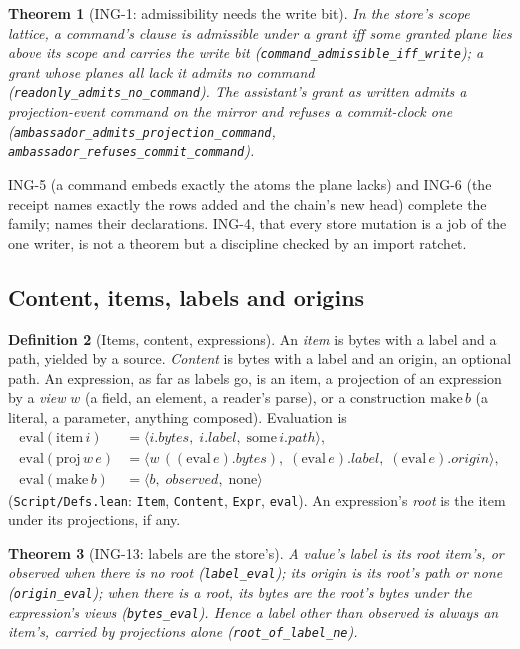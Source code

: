 \documentclass[11pt]{article}
\theoremstyle{plain}
\newtheorem{theorem}{Theorem}[section]
\theoremstyle{definition}
\newtheorem{definition}[theorem]{Definition}
\theoremstyle{remark}
\newcommand{\lean}[1]{\texttt{#1}}
\newcommand{\ing}[1]{ING-#1}
\begin{document}
\begin{theorem}[\ing{1}: admissibility needs the write bit]
In the store's scope lattice, a command's clause is admissible under a grant iff some granted
plane lies above its scope and carries the write bit (\lean{command\_admissible\_iff\_write});
a grant whose planes all lack it admits no command (\lean{readonly\_admits\_no\_command}). The
assistant's grant as written admits a projection-event command on the mirror and refuses a
commit-clock one (\lean{ambassador\_admits\_projection\_command},
\lean{ambassador\_refuses\_commit\_command}).
\end{theorem}

\ing{5} (a command embeds exactly the atoms the plane lacks) and \ing{6} (the receipt names
exactly the rows added and the chain's new head) complete the family;  names
their declarations. \ing{4}, that every store mutation is a job of the one writer, is not a
theorem but a discipline checked by an import ratchet.

\subsection{Content, items, labels and origins}

\begin{definition}[Items, content, expressions]
An \emph{item} is bytes with a label and a path, yielded by a source. \emph{Content} is bytes
with a label and an origin, an optional path. An expression, as far as labels go, is an item, a
projection of an expression by a \emph{view} $w$ (a field, an element, a reader's parse), or a
construction $\mathrm{make}\,b$ (a literal, a parameter, anything composed). Evaluation is
\begin{align*}
\mathrm{eval}(\mathrm{item}\,i) &= \langle i.\mathit{bytes},\; i.\mathit{label},\; \mathrm{some}\,i.\mathit{path}\rangle, \\
\mathrm{eval}(\mathrm{proj}\,w\,e) &= \langle w\,((\mathrm{eval}\,e).\mathit{bytes}),\; (\mathrm{eval}\,e).\mathit{label},\; (\mathrm{eval}\,e).\mathit{origin}\rangle, \\
\mathrm{eval}(\mathrm{make}\,b) &= \langle b,\; \mathit{observed},\; \mathrm{none}\rangle
\end{align*}
(\lean{Script/Defs.lean}: \lean{Item}, \lean{Content}, \lean{Expr}, \lean{eval}). An
expression's \emph{root} is the item under its projections, if any.
\end{definition}

\begin{theorem}[\ing{13}: labels are the store's]
A value's label is its root item's, or observed when there is no root
(\lean{label\_eval}); its origin is its root's path or none (\lean{origin\_eval}); when there is
a root, its bytes are the root's bytes under the expression's views (\lean{bytes\_eval}).
Hence a label other than observed is always an item's, carried by projections alone
(\lean{root\_of\_label\_ne}).
\end{theorem}
\end{document}
